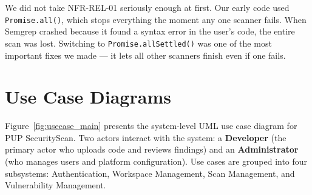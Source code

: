 \documentclass[12pt,a4paper]{report}
\begin{document}
\begin{lessonbox}
We did not take NFR-REL-01 seriously enough at first. Our early code used \texttt{Promise.all()}, which stops everything the moment any one scanner fails. When Semgrep crashed because it found a syntax error in the user's code, the entire scan was lost. Switching to \texttt{Promise.allSettled()} was one of the most important fixes we made --- it lets all other scanners finish even if one fails.
\end{lessonbox}

\section{Use Case Diagrams}
\label{sec:usecasediagrams}

Figure~\ref{fig:usecase_main} presents the system-level UML use case diagram for PUP SecurityScan. Two actors interact with the system: a \textbf{Developer} (the primary actor who uploads code and reviews findings) and an \textbf{Administrator} (who manages users and platform configuration). Use cases are grouped into four subsystems: Authentication, Workspace Management, Scan Management, and Vulnerability Management.
\end{document}
